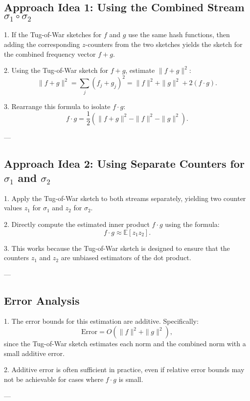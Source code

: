 \documentclass[12pt,letterpaper]{article}
\begin{document}
\subsection*{Approach Idea 1: Using the Combined Stream \( \sigma_1 \circ \sigma_2 \)}

1. If the Tug-of-War sketches for \( f \) and \( g \) use the same hash functions, then adding the corresponding \( z \)-counters from the two sketches yields the sketch for the combined frequency vector \( f + g \).
   
2. Using the Tug-of-War sketch for \( f + g \), estimate \( \|f + g\|^2 \):
   \[
   \|f + g\|^2 = \sum_{j} (f_j + g_j)^2 = \|f\|^2 + \|g\|^2 + 2(f \cdot g).
   \]

3. Rearrange this formula to isolate \( f \cdot g \):
   \[
   f \cdot g = \frac{1}{2}\left(\|f + g\|^2 - \|f\|^2 - \|g\|^2\right).
   \]

---

\subsection*{Approach Idea 2: Using Separate Counters for \( \sigma_1 \) and \( \sigma_2 \)}

1. Apply the Tug-of-War sketch to both streams separately, yielding two counter values \( z_1 \) for \( \sigma_1 \) and \( z_2 \) for \( \sigma_2 \).

2. Directly compute the estimated inner product \( f \cdot g \) using the formula:
   \[
   f \cdot g \approx \mathbb{E}[z_1 z_2].
   \]

3. This works because the Tug-of-War sketch is designed to ensure that the counters \( z_1 \) and \( z_2 \) are unbiased estimators of the dot product.

---

\subsection*{Error Analysis}

1. The error bounds for this estimation are additive. Specifically:
   \[
   \text{Error} = O(\|f\|^2 + \|g\|^2),
   \]
   since the Tug-of-War sketch estimates each norm and the combined norm with a small additive error.

2. Additive error is often sufficient in practice, even if relative error bounds may not be achievable for cases where \( f \cdot g \) is small.

---
\end{document}
